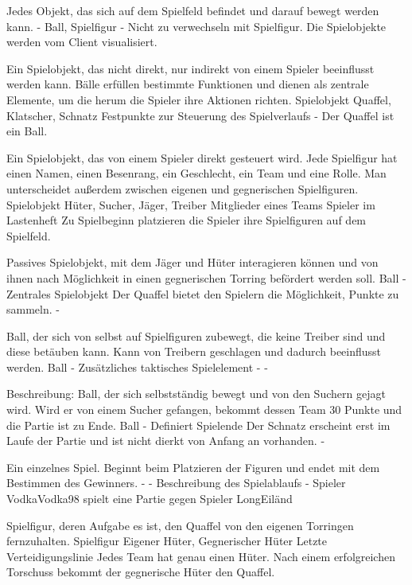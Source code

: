 {Jedes Objekt, das sich auf dem Spielfeld befindet und darauf bewegt werden kann.}
{-}
{Ball, Spielfigur}
{-}
{Nicht zu verwechseln mit Spielfigur.}
{Die Spielobjekte werden vom Client visualisiert.}

{Ein Spielobjekt, das nicht direkt, nur indirekt von einem Spieler beeinflusst werden kann. Bälle erfüllen bestimmte Funktionen und dienen als zentrale Elemente, um die herum die Spieler ihre Aktionen richten.}
{Spielobjekt}
{Quaffel, Klatscher, Schnatz}
{Festpunkte zur Steuerung des Spielverlaufs}
{-}
{Der Quaffel ist ein Ball.}

{Ein Spielobjekt, das von einem Spieler direkt gesteuert wird. Jede Spielfigur hat einen Namen, einen Besenrang, ein Geschlecht, ein Team und eine Rolle. Man unterscheidet außerdem zwischen eigenen und gegnerischen Spielfiguren.}
{Spielobjekt}
{Hüter, Sucher, Jäger, Treiber}
{Mitglieder eines Teams}
{Spieler im Lastenheft}
{Zu Spielbeginn platzieren die Spieler ihre Spielfiguren auf dem Spielfeld.}

{Passives Spielobjekt, mit dem Jäger und Hüter interagieren können und von ihnen nach Möglichkeit in einen gegnerischen Torring befördert werden soll.}
{Ball}
{-}
{Zentrales Spielobjekt}
{Der Quaffel bietet den Spielern die Möglichkeit, Punkte zu sammeln.}
{-}

{Ball, der sich von selbst auf Spielfiguren zubewegt, die keine Treiber sind und diese betäuben kann. Kann von Treibern geschlagen und dadurch beeinflusst werden.}
{Ball}
{-}
{Zusätzliches taktisches Spielelement}
{-}
{-}

{Beschreibung: Ball, der sich selbstständig bewegt und von den Suchern gejagt wird. Wird er von einem Sucher gefangen, bekommt dessen Team 30 Punkte und die Partie ist zu Ende.}
{Ball}
{-}
{Definiert Spielende}
{Der Schnatz erscheint erst im Laufe der Partie und ist nicht dierkt von Anfang an vorhanden.}
{-}

{Ein einzelnes Spiel. Beginnt beim Platzieren der Figuren und endet mit dem Bestimmen des Gewinners.}
{-}
{-}
{Beschreibung des Spielablaufs}
{-}
{Spieler \glqq{}VodkaVodka98\grqq{} spielt eine Partie gegen Spieler \glqq{}LongEiländ\grqq{}}

{Spielfigur, deren Aufgabe es ist, den Quaffel von den eigenen Torringen fernzuhalten.}
{Spielfigur}
{Eigener Hüter, Gegnerischer Hüter}
{Letzte Verteidigungslinie}
{Jedes Team hat genau einen Hüter.}
{Nach einem erfolgreichen Torschuss bekommt der gegnerische Hüter den Quaffel.}

